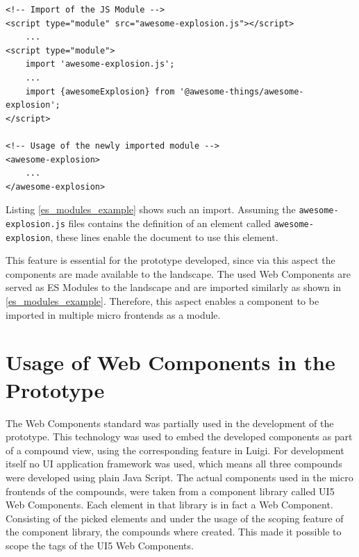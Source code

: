 \begin{lstlisting}[language=HTML5, caption=Importing modular Java Script documents into another \cite{wc_specifications}, label=es_modules_example]
<!-- Import of the JS Module -->
<script type="module" src="awesome-explosion.js"></script>
	...
<script type="module">
	import 'awesome-explosion.js';
	...
	import {awesomeExplosion} from '@awesome-things/awesome-explosion';
</script>

<!-- Usage of the newly imported module -->
<awesome-explosion>
	...
</awesome-explosion>
\end{lstlisting}

Listing \ref{es_modules_example} shows such an import. Assuming the \texttt{awesome-explosion.js} files contains the definition of an element called \texttt{awesome-explosion}, these lines enable the document to use this element.\cite{wc_specifications}

This feature is essential for the prototype developed, since via this aspect the components are made available to the landscape. The used Web Components are served as ES Modules to the landscape and are imported similarly as shown in \ref{es_modules_example}. Therefore, this aspect enables a component to be imported in multiple micro frontends as a module.

\section{Usage of Web Components in the Prototype}

The Web Components standard was partially used in the development of the prototype. This technology was used to embed the developed components as part of a compound view, using the corresponding feature in Luigi. \cite{luigi_wc} \cite{luigi_compound}
For development itself no UI application framework was used, which means all three compounds were developed using plain Java Script. The actual components used in the micro frontends of the compounds, were taken from a component library called UI5 Web Components. Each element in that library is in fact a Web Component.\cite{ui5_wc_github}
Consisting of the picked elements and under the usage of the scoping feature of the component library, the compounds where created. This made it possible to scope the tags of the UI5 Web Components.\cite{ui5_webcomponents_scoping}

